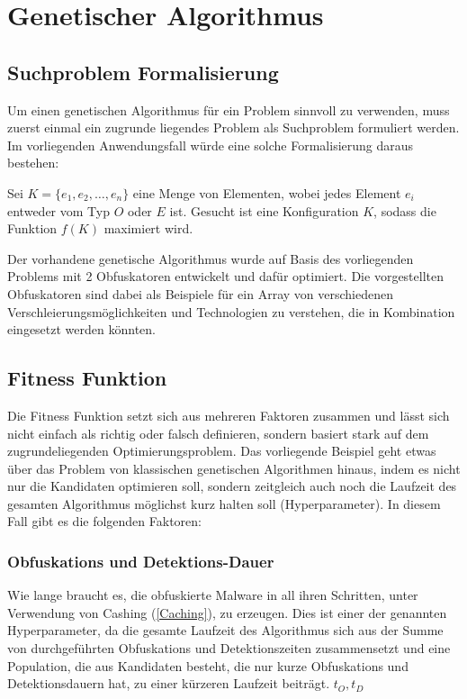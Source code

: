 \section{Genetischer Algorithmus}
\label{Sec:GeneticAlgorithmDetail}
\subsection{Suchproblem Formalisierung}
Um einen genetischen Algorithmus für ein Problem sinnvoll zu verwenden, muss zuerst einmal ein zugrunde liegendes Problem als Suchproblem formuliert werden. Im vorliegenden Anwendungsfall würde eine solche Formalisierung daraus bestehen:
    

Sei $K = \{e_1, e_2, \ldots, e_n\}$ eine Menge von Elementen, wobei jedes Element $e_i$ entweder vom Typ $O$ oder $E$ ist. Gesucht ist eine Konfiguration $K$, sodass die Funktion $f(K)$ maximiert wird.

Der vorhandene genetische Algorithmus wurde auf Basis des vorliegenden Problems mit 2 Obfuskatoren entwickelt und dafür optimiert. Die vorgestellten Obfuskatoren sind dabei als Beispiele für ein Array von verschiedenen Verschleierungsmöglichkeiten und Technologien zu verstehen, die in Kombination eingesetzt werden könnten.

\subsection{Fitness Funktion}
Die Fitness Funktion setzt sich aus mehreren Faktoren zusammen und lässt sich nicht einfach als richtig oder falsch definieren, sondern basiert stark auf dem zugrundeliegenden Optimierungsproblem. Das vorliegende Beispiel geht etwas über das Problem von klassischen genetischen Algorithmen hinaus, indem es nicht nur die Kandidaten optimieren soll, sondern zeitgleich auch noch die Laufzeit des gesamten Algorithmus möglichst kurz halten soll (Hyperparameter).
In diesem Fall gibt es die folgenden Faktoren:

    \subsubsection{Obfuskations und Detektions-Dauer}
    Wie lange braucht es, die obfuskierte Malware in all ihren Schritten, unter Verwendung von Cashing (\ref{Caching}), zu erzeugen. Dies ist einer der genannten Hyperparameter, da die gesamte Laufzeit des Algorithmus sich aus der Summe von durchgeführten Obfuskations und Detektionszeiten zusammensetzt und eine Population, die aus Kandidaten besteht, die nur kurze Obfuskations und Detektionsdauern hat, zu einer kürzeren Laufzeit beiträgt. $t_O,  t_D$
    
